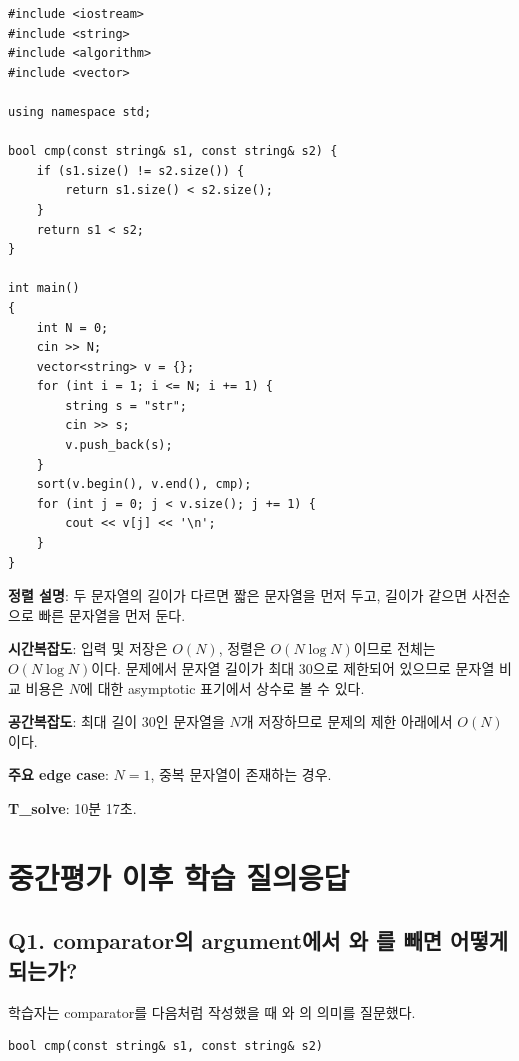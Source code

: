 \begin{answerbox}[학습자 제출 답안]
\begin{lstlisting}
#include <iostream>
#include <string>
#include <algorithm>
#include <vector>

using namespace std;

bool cmp(const string& s1, const string& s2) {
    if (s1.size() != s2.size()) {
        return s1.size() < s2.size();
    }
    return s1 < s2;
}

int main()
{
    int N = 0;
    cin >> N;
    vector<string> v = {};
    for (int i = 1; i <= N; i += 1) {
        string s = "str";
        cin >> s;
        v.push_back(s);
    }
    sort(v.begin(), v.end(), cmp);
    for (int j = 0; j < v.size(); j += 1) {
        cout << v[j] << '\n';
    }
}
\end{lstlisting}

\textbf{정렬 설명}: 두 문자열의 길이가 다르면 짧은 문자열을 먼저 두고, 길이가 같으면 사전순으로 빠른 문자열을 먼저 둔다.

\textbf{시간복잡도}: 입력 및 저장은 $O(N)$, 정렬은 $O(N\log N)$이므로 전체는 $O(N\log N)$이다. 문제에서 문자열 길이가 최대 30으로 제한되어 있으므로 문자열 비교 비용은 $N$에 대한 asymptotic 표기에서 상수로 볼 수 있다.

\textbf{공간복잡도}: 최대 길이 30인 문자열을 $N$개 저장하므로 문제의 제한 아래에서 $O(N)$이다.

\textbf{주요 edge case}: $N=1$, 중복 문자열이 존재하는 경우.

\textbf{T\_solve}: 10분 17초.
\end{answerbox}

\section{중간평가 이후 학습 질의응답}

\subsection{Q1. comparator의 argument에서 와 \code{\&}를 빼면 어떻게 되는가?}
학습자는 comparator를 다음처럼 작성했을 때 와 \code{\&}의 의미를 질문했다.
\begin{lstlisting}
bool cmp(const string& s1, const string& s2)
\end{lstlisting}

